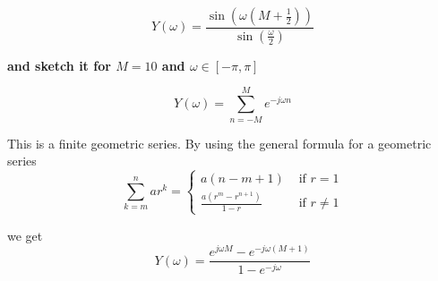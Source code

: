 \begin{equation*}
    Y(\omega)=\frac{\sin \left(\omega\left(M+\frac{1}{2}\right)\right)}{\sin \left(\frac{\omega}{2}\right)} 
\end{equation*}

\textbf{and sketch it for $M=10$ and $\omega \in [-\pi,\pi]$}

\begin{equation*}
    Y(\omega)=\sum_{n=-M}^M e^{-j\omega n}
\end{equation*}

This is a finite geometric series. By using the general formula for a geometric series
\begin{equation*}
    \sum_{k=m}^{n} a r^{k}=\left\{\begin{array}{ll}a(n-m+1) & \text { if } r=1 \\ \frac{a\left(r^{m}-r^{n+1}\right)}{1-r} & \text { if } r \neq 1\end{array}\right. 
\end{equation*}

we get
\begin{equation*}
    Y(\omega)=\frac{e^{j\omega M}-e^{-j\omega (M+1)}}{1-e^{-j\omega}}
\end{equation*}